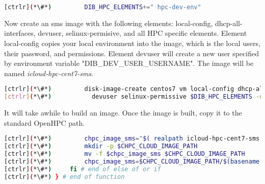 
\begin{lstlisting}[language=bash,keywords={}]
[ctrlr](*\#*)         DIB_HPC_ELEMENTS+=" hpc-dev-env"
\end{lstlisting} 

	Now create an sms image with the following elements: local-config, dhcp-all-interfaces, devuser, selinux-permisive, and all HPC specific elements. Element local-config copies your local environment into the image, which is the local users, their password, and permissions. Element devuser will create a new user specified by environment variable "DIB\_DEV\_USER\_USERNAME". The image will be named  {\em  icloud-hpc-cent7-sms}.


\begin{lstlisting}[language=bash,keywords={}]
[ctrlr](*\#*)         disk-image-create centos7 vm local-config dhcp-all-interfaces \
[ctrlr](*\#*)         	devuser selinux-permissive $DIB_HPC_ELEMENTS -o icloud-hpc-cent7-sms
\end{lstlisting} 

	It will take awhile to build an image. Once the image is built, copy it to the standard OpenHPC path.


\begin{lstlisting}[language=bash,keywords={}]
[ctrlr](*\#*)         chpc_image_sms="$( realpath icloud-hpc-cent7-sms.qcow2)"
[ctrlr](*\#*)         mkdir -p $CHPC_CLOUD_IMAGE_PATH
[ctrlr](*\#*)         mv -f $chpc_image_sms $CHPC_CLOUD_IMAGE_PATH
[ctrlr](*\#*)         chpc_image_sms=$CHPC_CLOUD_IMAGE_PATH/$(basename $chpc_image_sms)
[ctrlr](*\#*)     fi # end of else of or if
[ctrlr](*\#*) } # end of function
\end{lstlisting} 
